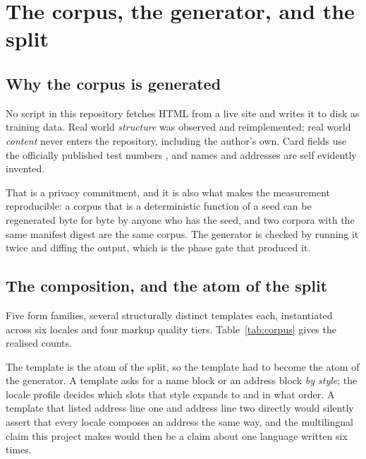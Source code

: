 \chapter{The corpus, the generator, and the split}
\label{ch:corpus}

\section{Why the corpus is generated}

No script in this repository fetches HTML from a live site and writes it to disk
as training data. Real world \emph{structure} was observed and reimplemented;
real world \emph{content} never enters the repository, including the author's
own. Card fields use the officially published test numbers
\cite{stripe-testing}, and names and addresses are self evidently invented.

That is a privacy commitment, and it is also what makes the measurement
reproducible: a corpus that is a deterministic function of a seed can be
regenerated byte for byte by anyone who has the seed, and two corpora with the
same manifest digest are the same corpus. The generator is checked by running it
twice and diffing the output, which is the phase gate that produced it.

\section{The composition, and the atom of the split}

\begin{table}[htbp]
  \centering
  \caption{The realised generator grid and the partitions it was split into.}
  \label{tab:corpus}
  
\end{table}

Five form families, several structurally distinct templates each, instantiated
across six locales and four markup quality tiers. Table~\ref{tab:corpus} gives
the realised counts.

The template is the atom of the split, so the template had to become the atom of
the generator. A template asks for a name block or an address block \emph{by
style}; the locale profile decides which slots that style expands to and in what
order. A template that listed address line one and address line two directly
would silently assert that every locale composes an address the same way, and
the multilingual claim this project makes would then be a claim about one
language written six times.

